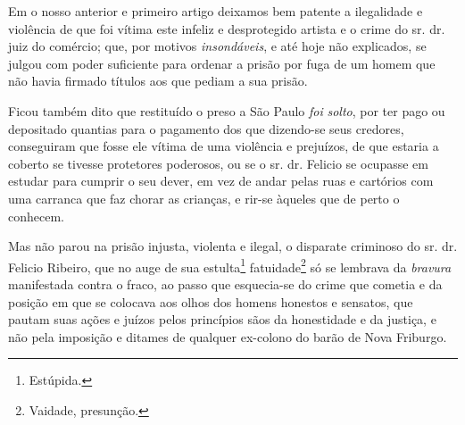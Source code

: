 \asterisc{}

Em o nosso anterior e primeiro artigo deixamos bem patente a ilegalidade
e violência de que foi vítima este infeliz e desprotegido artista e o
crime do sr. dr. juiz do comércio; que, por motivos \emph{insondáveis},
e até hoje não explicados, se julgou com poder suficiente para ordenar a
prisão por fuga de um homem que não havia firmado títulos aos que pediam
a sua prisão.

Ficou também dito que restituído o preso a São Paulo \emph{foi}
\emph{solto}, por ter pago ou depositado quantias para o pagamento dos
que dizendo-se seus credores, conseguiram que fosse ele vítima de uma
violência e prejuízos, de que estaria a coberto se tivesse protetores
poderosos, ou se o sr. dr. Felicio se ocupasse em estudar para cumprir o
seu dever, em vez de andar pelas ruas e cartórios com uma carranca que
faz chorar as crianças, e rir-se àqueles que de perto o conhecem.

Mas não parou na prisão injusta, violenta e ilegal, o disparate
criminoso do sr. dr. Felicio Ribeiro, que no auge de sua
estulta\footnote{ Estúpida.} fatuidade\footnote{ Vaidade, presunção.}
só se lembrava da \emph{bravura} manifestada contra o fraco, ao passo
que esquecia-se do crime que cometia e da posição em que se colocava aos
olhos dos homens honestos e sensatos, que pautam suas ações e juízos
pelos princípios sãos da honestidade e da justiça, e não pela imposição
e ditames de qualquer ex-colono do barão de Nova Friburgo.

